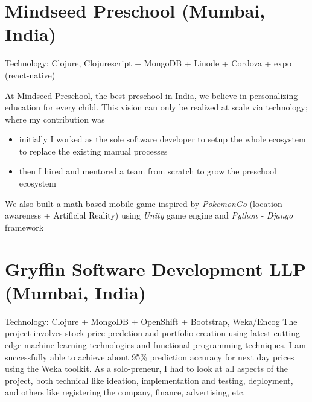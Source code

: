 \documentclass[11pt,a4paper,sans]{moderncv} %
\begin{document}
\section{Mindseed Preschool (Mumbai, India)}
         {}{Technology: Clojure, Clojurescript + MongoDB + Linode + Cordova + expo (react-native)}
         {At Mindseed Preschool, the best preschool in India, we believe in personalizing education for every child. This vision can only be realized at scale via technology; where my contribution was
           \begin{itemize}
           \item initially I worked as the sole software developer to setup the whole ecosystem to replace the existing manual processes
           \item then I hired and mentored a team from scratch to grow the preschool ecosystem
           \end{itemize}
         We also built a math based mobile game inspired by \textit{PokemonGo} (location awareness + Artificial Reality) using \textit{Unity} game engine and \textit{Python - Django} framework}

\section{Gryffin Software Development LLP (Mumbai, India)}
         {}{Technology: Clojure + MongoDB + OpenShift + Bootstrap, Weka/Encog}
         {The project involves stock price predction and portfolio creation using latest cutting edge machine learning technologies and functional programming techniques. I am successfully able to achieve about 95\% prediction accuracy for next day prices using the Weka toolkit. As a solo-preneur, I had to look at all aspects of the project, both technical like ideation, implementation and testing, deployment, and others like registering the company, finance, advertising, etc.}

\newpage{}
\end{document}
